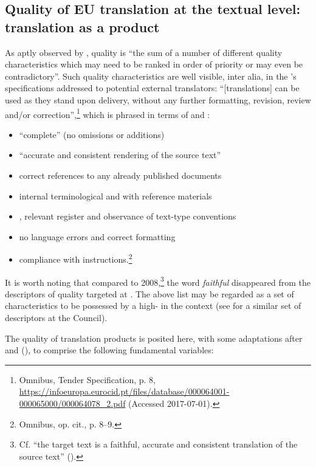 \documentclass[output=paper]{langsci/langscibook}
\begin{document}
\subsection{Quality of EU translation at the textual level: translation as a product}\label{sec:biel:3.1}

As aptly observed by \citet[142]{Strandvik2015}, quality is “the sum of a number of different quality characteristics which may need to be ranked in order of priority or may even be contradictory”. Such quality characteristics are well visible, inter alia, in the ’s specifications addressed to potential external translators: “[translations] can be used as they stand upon delivery, without any further formatting, revision, review and/or correction”,\footnote{Omnibus,  Tender Specification, p. 8, \url{https://infoeuropa.eurocid.pt/files/database/000064001-000065000/000064078_2.pdf} (Accessed 2017-07-01).} which is phrased in terms of   and :

\begin{itemize}
\item 
“complete” (no omissions or additions)
\item 
“accurate and consistent rendering of the source text”
\item 
correct references to any already published documents
\item 
internal terminological  and  with reference materials
\item 
{}, relevant register and observance of text-type conventions
\item 
no language errors and correct formatting
\item 
compliance with instructions.\footnote{Omnibus, op. cit., p. 8--9.}
\end{itemize}

It is worth noting that compared to 2008,\footnote{Cf. “the target text is a faithful, accurate and consistent translation of the source text” (\citealt[6]{DGT2008}).} the word \textit{faithful} disappeared from the descriptors of quality targeted at . The above list may be regarded as a set of characteristics to be possessed by a high- in the  context (see  for a similar set of descriptors at the Council). 

The quality of  translation products is posited here, with some adaptations after \citet{Chesterman2004} and \citeauthor{Biel2011b} (\citeyear*{Biel2011b,Biel2014}), to comprise the following fundamental variables:
\end{document}
